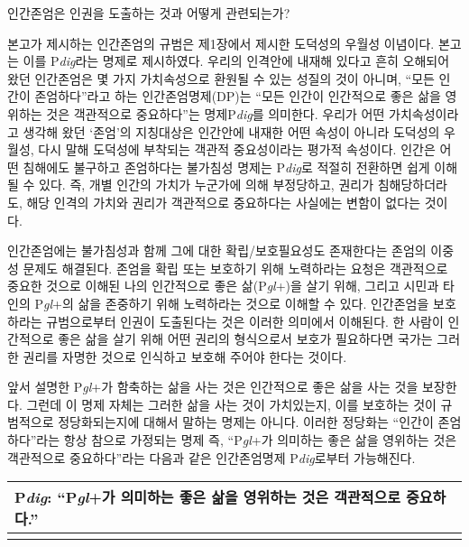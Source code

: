 인간존엄은 인권을 도출하는 것과 어떻게 관련되는가?

본고가 제시하는 인간존엄의 규범은 제1장에서 제시한 도덕성의 우월성 이념이다. 본고는 이를 P\emph{dig}라는 명제로 제시하였다. 우리의 인격안에 내재해 있다고 흔히 오해되어 왔던 인간존엄은 몇 가지 가치속성으로 환원될 수 있는 성질의 것이 아니며, ``모든 인간이 존엄하다''라고 하는 인간존엄명제(DP)는 ``모든 인간이 인간적으로 좋은 삶을 영위하는 것은 객관적으로 중요하다''는 명제P\emph{dig}를 의미한다. 우리가 어떤 가치속성이라고 생각해 왔던 `존엄'의 지칭대상은 인간안에 내재한 어떤 속성이 아니라 도덕성의 우월성, 다시 말해 도덕성에 부착되는 객관적 중요성이라는 평가적 속성이다. 인간은 어떤 침해에도 불구하고 존엄하다는 불가침성 명제는 P\emph{dig}로 적절히 전환하면 쉽게 이해될 수 있다. 즉, 개별 인간의 가치가 누군가에 의해 부정당하고, 권리가 침해당하더라도, 해당 인격의 가치와 권리가 객관적으로 중요하다는 사실에는 변함이 없다는 것이다.

인간존엄에는 불가침성과 함께 그에 대한 확립/보호필요성도 존재한다는 존엄의 이중성 문제도 해결된다. 존엄을 확립 또는 보호하기 위해 노력하라는 요청은 객관적으로 중요한 것으로 이해된 나의 인간적으로 좋은 삶(P\emph{gl}+)을 살기 위해, 그리고 시민과 타인의 P\emph{gl}+의 삶을 존중하기 위해 노력하라는 것으로 이해할 수 있다. 인간존엄을 보호하라는 규범으로부터 인권이 도출된다는 것은 이러한 의미에서 이해된다. 한 사람이 인간적으로 좋은 삶을 살기 위해 어떤 권리의 형식으로서 보호가 필요하다면 국가는 그러한 권리를 자명한 것으로 인식하고 보호해 주어야 한다는 것이다.

앞서 설명한 P\emph{gl}+가 함축하는 삶을 사는 것은 인간적으로 좋은 삶을 사는 것을 보장한다. 그런데 이 명제 자체는 그러한 삶을 사는 것이 가치있는지, 이를 보호하는 것이 규범적으로 정당화되는지에 대해서 말하는 명제는 아니다. 이러한 정당화는 ``인간이 존엄하다''라는 항상 참으로 가정되는 명제 즉, ``P\emph{gl}+가 의미하는 좋은 삶을 영위하는 것은 객관적으로 중요하다''라는 다음과 같은 인간존엄명제 P\emph{dig}로부터 가능해진다.

\begin{longtable}[]{@{}
  >{\raggedright\arraybackslash}p{}@{}}
\toprule\noalign{}
\begin{minipage}[b]{\linewidth}\centering
\textbf{P\emph{dig}}: ``\textbf{P\emph{gl}+}가 의미하는 좋은 삶을 영위하는 것은 객관적으로 중요하다.''
\end{minipage} \\
\midrule\noalign{}
\endhead
\bottomrule\noalign{}
\endlastfoot
\end{longtable}

